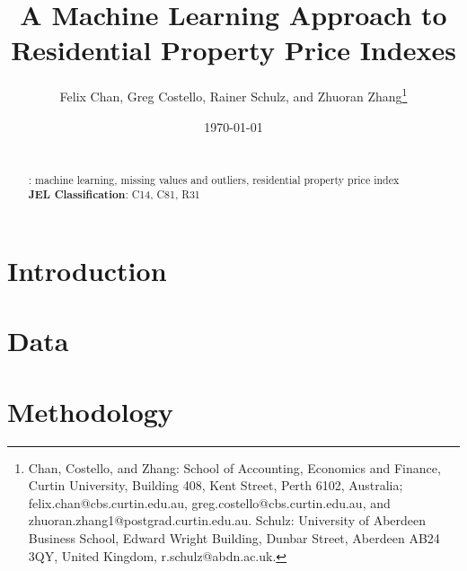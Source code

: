 \documentclass[12pt,a4paper]{article}
\begin{document}
\title{A Machine Learning Approach to Residential Property Price Indexes}

\author{Felix Chan, Greg Costello, Rainer Schulz, and Zhuoran Zhang\thanks{Chan, Costello, and Zhang: School of Accounting, Economics and Finance, Curtin University, Building 408, Kent Street, Perth 6102, Australia; {felix.chan@cbs.curtin.edu.au}, {greg.costello@cbs.curtin.edu.au}, and {zhuoran.zhang1@postgrad.curtin.edu.au}. Schulz: University of Aberdeen Business School, Edward Wright Building, Dunbar Street, Aberdeen AB24 3QY, United Kingdom, {r.schulz@abdn.ac.uk}.\setlength{\baselineskip}{1.25em}}}

\date{\today}

\maketitle

\newpage
\begin{abstract}
\noindent 
\\[1em]
: machine learning, missing values and outliers,  residential property price index\\[2.5mm]
{\bf JEL Classification}:  C14, C81, R31
\setlength{\baselineskip}{1.25em}
\end{abstract}

\newpage
\section{Introduction}


\section{Data}\label{sec:data}


\section{Methodology}\label{sec:methodology}

\end{document}
